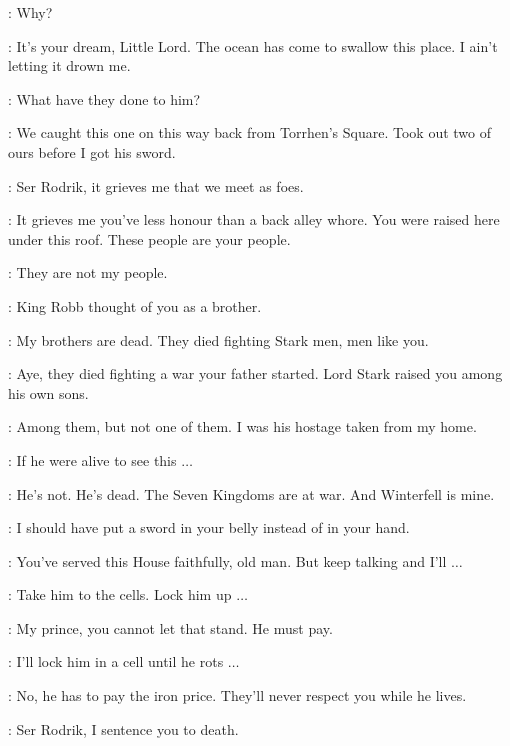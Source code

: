 
\BRAN:  Why? 

\OSHA:  It's your dream, Little Lord. The ocean has come to swallow this place. I ain't letting it drown me. 


\BRAN: What have they done to him? 

\LORREN: We caught this one on this way back from Torrhen's Square. Took out two of ours before I got his sword. 

\THEON: Ser Rodrik, it grieves me that we meet as foes. 

\RODRIK: It grieves me you've less honour than a back alley whore. You were raised here under this roof. These people are your people. 

\THEON: They are not my people. 

\RODRIK: King Robb thought of you as a brother. 

\THEON: My brothers are dead. They died fighting Stark men, men like you. 

\RODRIK: Aye, they died fighting a war your father started. Lord Stark raised you among his own sons. 

\THEON: Among them, but not one of them. I was his hostage taken from my home. 

\RODRIK: If he were alive to see this $\ldots$  

\THEON: He's not. He's dead. The Seven Kingdoms are at war. And Winterfell is mine. 

\RODRIK: I should have put a sword in your belly instead of in your hand. 

\THEON: You've served this House faithfully, old man. But keep talking and I'll $\ldots$  


\THEON: Take him to the cells. Lock him up $\ldots$  

\DAGMER: My prince, you cannot let that stand. He must pay. 

\THEON: I'll lock him in a cell until he rots $\ldots$  

\DAGMER: No, he has to pay the iron price. They'll never respect you while he lives. 

\THEON: Ser Rodrik, I sentence you to death. 

